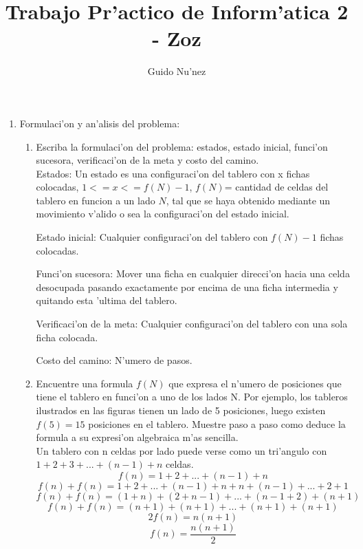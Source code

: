 \documentclass[11pt]{article}
\begin{document}
\title{Trabajo Pr'actico de Inform'atica 2 - Zoz}
\author{Guido Nu'nez}
\maketitle

\begin{enumerate}
	
\item Formulaci'on y an'alisis del problema:	
	
	\begin{enumerate}
	
	\item Escriba la formulaci'on del problema: estados, estado inicial, funci'on sucesora, verificaci'on de la meta y costo del camino. \\
	
	Estados: Un estado es una configuraci'on del tablero con x fichas colocadas, $1<=x<=f(N)-1$, $f(N)$= cantidad de celdas del tablero en funcion a un lado $N$, tal que se haya obtenido mediante un movimiento v'alido o sea la configuraci'on del estado inicial.
	
	Estado inicial: Cualquier configuraci'on del tablero con $f(N)-1$ fichas colocadas.
	
	Funci'on sucesora: Mover una ficha en cualquier direcci'on hacia una celda desocupada pasando exactamente por encima de una ficha intermedia y quitando esta 'ultima del tablero.
	
	Verificaci'on de la meta: Cualquier configuraci'on del tablero con una sola ficha colocada.
	
	Costo del camino: N'umero de pasos. \\
	
	\item Encuentre una formula $f(N)$ que expresa el n'umero de posiciones que tiene el tablero en funci'on a uno de los lados N. Por ejemplo, los tableros ilustrados en las figuras tienen un lado de 5 posiciones, luego existen $f(5) = 15$ posiciones en el tablero. Muestre paso a paso como deduce la 	formula a su expresi'on algebraica m'as sencilla. \\
	
	Un tablero con n celdas por lado puede verse como un tri'angulo con $1+2+3+...+(n-1)+n$ celdas.
	$$f(n)=1+2+...+(n-1)+n$$
	$$f(n)+f(n)=1+2+...+(n-1)+n+n+(n-1)+...+2+1$$
	$$f(n)+f(n)=(1+n)+(2+n-1)+...+(n-1+2)+(n+1)$$
	$$f(n)+f(n)=(n+1)+(n+1)+...+(n+1)+(n+1)$$
	$$2f(n)=n(n+1)$$
	$$f(n)=\frac{n(n+1)}{2}$$ \\
	

\end{enumerate}
\end{enumerate}
\end{document}
